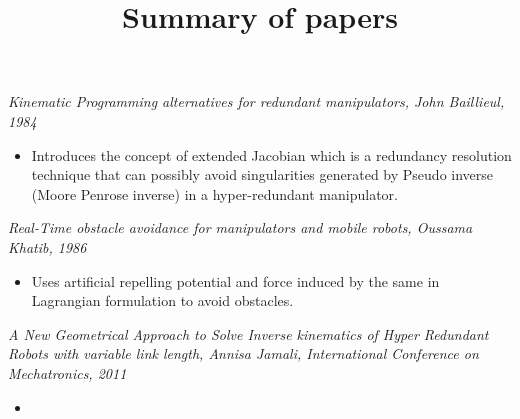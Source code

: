 \documentclass[10pt,a4paper]{article}
\title{Summary of papers}
\begin{document}
\maketitle

\textit{Kinematic Programming alternatives for redundant manipulators, John Baillieul, 1984}
\begin{itemize}
\item Introduces the concept of extended Jacobian which is a redundancy resolution technique that can possibly avoid singularities generated by Pseudo inverse (Moore Penrose inverse) in a hyper-redundant manipulator.
\end{itemize}

\textit{Real-Time obstacle avoidance for manipulators and mobile robots, Oussama Khatib, 1986}
\begin{itemize}
\item Uses artificial repelling potential and force induced by the same in Lagrangian formulation to avoid obstacles.
\end{itemize}

\textit{A New Geometrical Approach to Solve Inverse kinematics of Hyper Redundant Robots with variable link length, Annisa Jamali,  International Conference on Mechatronics, 2011}
\begin{itemize}
\item 
\end{itemize}
\end{document}
